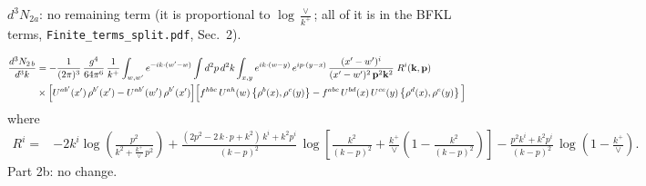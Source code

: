 \documentclass[9pt]{article}
\newcommand{\new}[1]{{\color{blue}#1}}
\numberwithin{equation}{section}
\begin{document}
\new{$d^3N_{2a}$: no remaining term (it is proportional to $\log\frac{\vee}{k^+}$; all of it is in the BFKL terms, \texttt{Finite\_terms\_split.pdf}, Sec.~2).}

\begin{align}
\frac{d^{3}N_{2\,b}}{d^{3}k} & = -\frac{1}{(2\pi)^{3}}\,\frac{g^{4}}{64\pi^{6}}\,\frac{1}{k^{+}}\int_{w,w'} e^{-ik\cdot(w'-w)}
\int d^{2}p\,d^{2}k\int_{x,y} e^{ik\cdot(w-y)}\,e^{ip\cdot(y-x)}\,\frac{(x'-w')^{i}}{(x'-w')^{2}\,\mathbf{p}^{2}\mathbf{k}^{2}}\;R^{i}(\mathbf{k},\mathbf{p})\notag\\
&\times\Big[U^{ab'}(x')\,\rho^{b'}(x')-U^{ab'}(w')\,\rho^{b'}(x')\Big]
\Big[f^{hbc}\,U^{ah}(w)\left\{\rho^{b}(x),\rho^{c}(y)\right\}-f^{abc}\,U^{bd}(x)\,U^{ce}(y)\left\{\rho^{d}(x),\rho^{e}(y)\right\}\Big]
\end{align}
where
\begin{align}
R^{i} =& -2k^{i}\log\left(\frac{p^{2}}{k^{2}+\frac{k^{+}}{\vee}\,p^{2}}\right)
+\frac{(2p^{2}-2\,k\cdot p+k^{2})\,k^{i}+k^{2}p^{i}}{(k-p)^{2}}\,
\log\left[\frac{k^{2}}{(k-p)^{2}}+\frac{k^{+}}{\vee}\left(1-\frac{k^{2}}{(k-p)^{2}}\right)\right]
-\frac{p^{2}k^{i}+k^{2}p^{i}}{(k-p)^{2}}\,\log\left(1-\frac{k^{+}}{\vee}\right).
\end{align}
\new{Part 2b: no change.}
\end{document}
